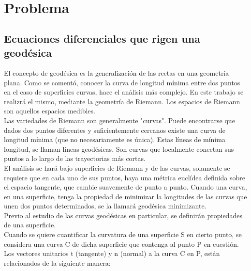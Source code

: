 \documentclass{endm}
\begin{document}
%
\section{Problema}\label{Problema}

\subsection{Ecuaciones diferenciales que rigen una geod\'esica}


El concepto de geod\'esica es la generalizaci\'on de las rectas en una geometr\'ia plana. Como se coment\'o, conocer la curva de longitud m\'inima entre dos puntos en el caso de superficies curvas, hace el an\'alisis m\'as complejo. En este trabajo se realizr\'a el mismo, mediante la geometr\'ia de Riemann. Los espacios de Riemann son aquellos espacios medibles.\\

Las variedades de Riemann son generalmente "curvas". Puede encontrarse que dados dos puntos diferentes y suficientemente cercanos existe una curva de longitud m\'inima (que no necesariamente es \'unica). Estas l\'ineas de m\'inima longitud, se llaman l\'ineas geod\'esicas. Son curvas que localmente conectan sus puntos a lo largo de las trayectorias m\'as cortas.\\

El an\'alisis se har\'a bajo superficies de Riemann y de las curvas, solamente se requiere que en cada uno de sus puntos, haya una m\'etrica eucl\'idea definida sobre el espacio tangente, que cambie suavemente de punto a punto. Cuando una curva, en una superficie, tenga la propiedad de minimizar la longitudes de las curvas que unen dos puntos determinados, se la llamar\'a geod\'esica minimizante.\\

Previo al estudio de las curvas geod\'esicas en particular, se definir\'an propiedades de una superficie.\\

Cuando se quiere cuantificar la curvatura de una superficie S en cierto punto, se considera una curva C de dicha superficie que contenga al punto P en cuesti\'on.\\

Los vectores unitarios t (tangente) y n (normal) a la curva C en P, est\'an relacionados de la siguiente manera:\\
\end{document}
